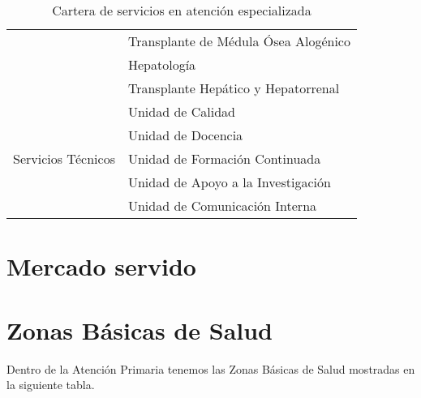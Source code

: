 \begin{table}[H]
\begin{tabular}{cl}
                                                            & Transplante de Médula Ósea Alogénico \\
                                                            & Hepatología                          \\
                                                            & Transplante Hepático y Hepatorrenal  \\
        \midrule
        \multirow{5}{*}{Servicios Técnicos}                 & Unidad de Calidad                    \\
                                                            & Unidad de Docencia                   \\
                                                            & Unidad de Formación Continuada       \\
                                                            & Unidad de Apoyo a la Investigación   \\
                                                            & Unidad de Comunicación Interna       \\
        \bottomrule
    \end{tabular}
    \caption{Cartera de servicios en atención especializada}
\end{table}

\section{Mercado servido}


\section{Zonas Básicas de Salud}

Dentro de la Atención Primaria tenemos las Zonas Básicas de Salud mostradas en la siguiente tabla.

